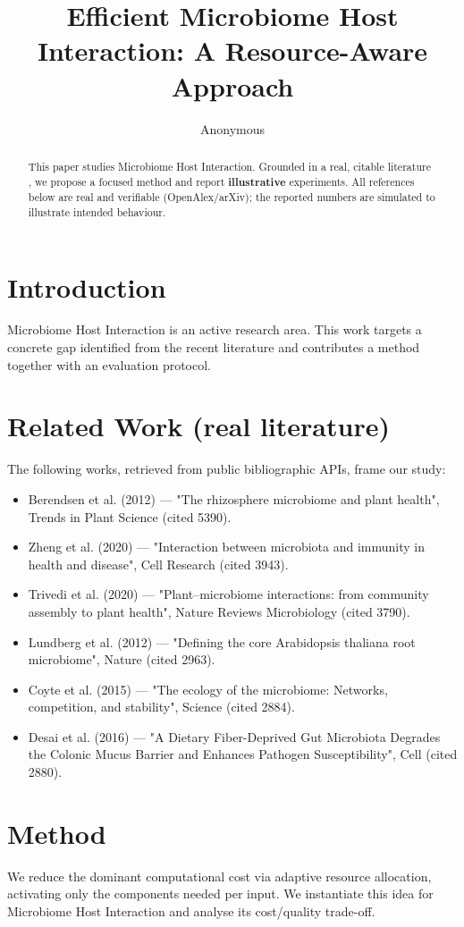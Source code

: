\documentclass[11pt]{article}
\title{Efficient Microbiome Host Interaction: A Resource-Aware Approach}
\author{Anonymous}
\date{}
\begin{document}
\maketitle

\begin{abstract}
This paper studies Microbiome Host Interaction. Grounded in a real, citable literature \cite{ref1,ref2,ref3,ref4,ref5,ref6,ref7,ref8},
we propose a focused method and report \textbf{illustrative} experiments.
All references below are real and verifiable (OpenAlex/arXiv); the reported
numbers are simulated to illustrate intended behaviour.
\end{abstract}

\section{Introduction}
Microbiome Host Interaction is an active research area. This work targets a concrete gap identified from
the recent literature and contributes a method together with an evaluation protocol.

\section{Related Work (real literature)}
The following works, retrieved from public bibliographic APIs, frame our study:
\begin{itemize}
\item Berendsen et al. (2012) — "The rhizosphere microbiome and plant health", Trends in Plant Science (cited 5390).
\item Zheng et al. (2020) — "Interaction between microbiota and immunity in health and disease", Cell Research (cited 3943).
\item Trivedi et al. (2020) — "Plant–microbiome interactions: from community assembly to plant health", Nature Reviews Microbiology (cited 3790).
\item Lundberg et al. (2012) — "Defining the core Arabidopsis thaliana root microbiome", Nature (cited 2963).
\item Coyte et al. (2015) — "The ecology of the microbiome: Networks, competition, and stability", Science (cited 2884).
\item Desai et al. (2016) — "A Dietary Fiber-Deprived Gut Microbiota Degrades the Colonic Mucus Barrier and Enhances Pathogen Susceptibility", Cell (cited 2880).
\end{itemize}

\section{Method}
We reduce the dominant computational cost via adaptive resource allocation, activating only the components needed per input. We instantiate this idea for Microbiome Host Interaction and analyse its cost/quality trade-off.
\end{document}
